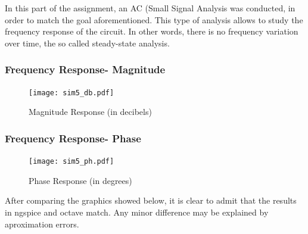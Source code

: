 In this part of the assignment, an AC (Small Signal Analysis was conducted, in order to match the goal aforementioned. This type of analysis allows to study the frequency response of the circuit. In other words, there is no frequency variation over time, the so called steady-state analysis.


\subsubsection{Frequency Response- Magnitude}

\begin{figure}[h] \centering
\texttt{[image: sim5\_db.pdf]}
\caption{Magnitude Response (in decibels)}
\label{fig:sim5_db}
\end{figure}

\subsubsection{Frequency Response- Phase}


\begin{figure}[h] \centering
\texttt{[image: sim5\_ph.pdf]}
\caption{Phase Response (in degrees)}
\label{fig:sim5_ph}
\end{figure}
\newpage

After comparing the graphics showed below, it is clear to admit that the results in ngspice and octave match. Any minor difference may be explained by aproximation errors.




